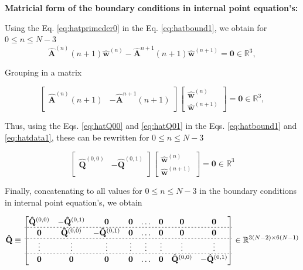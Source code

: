 \textbf{Matricial form of the boundary conditions in internal point equation's:}

Using %
the Eq. \ref{eq:hatprimeder0} in 
the Eq. \ref{eq:hatbound1},
we obtain for $0 \leq n\leq N-3$
\begin{equation}
 \mathbf{\hat{A}}^{(n)}(n+1) \mathbf{\hat{w}}^{(n)} - \mathbf{\hat{A}}^{n+1}(n+1) \mathbf{\hat{w}}^{(n+1)} 
 =
 \mathbf{0} \in \mathbb{R}^{3},
\end{equation}

Grouping in a matrix

\begin{equation}\label{eq:hatdata1}
\begin{bmatrix}
\mathbf{\hat{A}}^{(n)}(n+1) & -\mathbf{\hat{A}}^{n+1}(n+1)\\
\end{bmatrix}
\begin{bmatrix}
\mathbf{\hat{w}}^{(n)}\\
\mathbf{\hat{w}}^{(n+1)}
\end{bmatrix}
=\mathbf{0}\in \mathbb{R}^{3},
\end{equation}

Thus,
using the Eqs. \ref{eq:hatQ00} and \ref{eq:hatQ01} in 
the Eqs. \ref{eq:hatbound1} and \ref{eq:hatdata1}, 
these can be rewritten for $0 \leq n\leq N-3$

\begin{equation}
\begin{bmatrix}
\mathbf{\hat{Q}}^{(0,0)} & -\mathbf{\hat{Q}}^{(0,1)}\\
\end{bmatrix}
\begin{bmatrix}
\mathbf{\hat{w}}^{(n)}\\
\mathbf{\hat{w}}^{(n+1)}
\end{bmatrix}
=\mathbf{0}\in \mathbb{R}^{3}
\end{equation}

Finally, 
concatenating to all values for $0 \leq n\leq N-3$
in the boundary conditions in internal point equation's, we obtain

\begin{equation}
\mathbf{\hat{Q}}
\equiv
\begin{bmatrix}
\mathbf{\hat{Q}}^{(0,0)} & -\mathbf{\hat{Q}}^{(0,1)} & \mathbf{0} & \mathbf{0} & \hdots & \mathbf{0} & \mathbf{0} & \mathbf{0}\\ \hdashline[2pt/2pt]
\mathbf{0} & \mathbf{\hat{Q}}^{(0,0)} & -\mathbf{\hat{Q}}^{(0,1)} & \mathbf{0} & \hdots & \mathbf{0} & \mathbf{0} & \mathbf{0}\\ \hdashline[2pt/2pt]
\vdots     & \vdots             & \vdots             & \vdots     & \vdots & \vdots     & \vdots     & \vdots    \\ \hdashline[2pt/2pt]
\mathbf{0} & \mathbf{0}         & \mathbf{0}         & \mathbf{0} & \hdots & \mathbf{0} & \mathbf{\hat{Q}}^{(0,0)} & -\mathbf{\hat{Q}}^{(0,1)}\\
\end{bmatrix}
\in \mathbb{R}^{3(N-2)\times 6(N-1)}
\end{equation}

